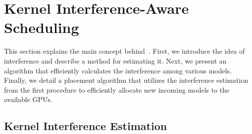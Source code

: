 \section{Kernel Interference-Aware Scheduling}\label{sec:kernel_interference_aware_scheduling}
This section explains the main concept behind~\roomie. First, we introduce the idea of interference and describe a method for estimating it. Next, we present an algorithm that efficiently calculates the interference among various models. Finally, we detail a placement algorithm that utilizes the interference estimation from the first procedure to efficiently allocate new incoming models to the available GPUs.

\subsection{Kernel Interference Estimation}



